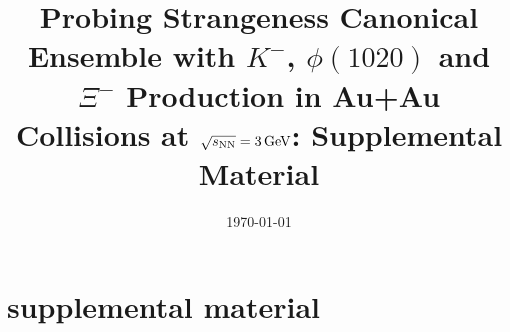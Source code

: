 \documentclass[%
 reprint,	
showpacs,
 amsmath,amssymb,
 aps,
 superscriptaddress,
]{revtex4-1}
\begin{document}

\title{Probing Strangeness Canonical Ensemble with $K^{-}$, $\phi(1020)$ and $\Xi^{-}$ Production in Au+Au Collisions at ${\sqrt{s_{\rm NN}} = \rm{3\,GeV}}$: Supplemental Material}%



\date{\today}%



\maketitle


% 


\section{supplemental material}
\end{document}
